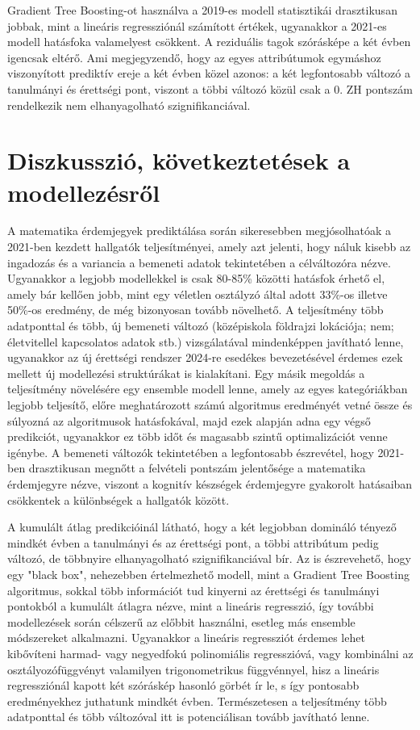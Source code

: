 \documentclass[12pt]{article}
\begin{document}
\noindent Gradient Tree Boosting-ot használva a 2019-es modell statisztikái drasztikusan jobbak, mint a lineáris regressziónál számított értékek, ugyanakkor a 2021-es modell hatásfoka valamelyest csökkent. A reziduális tagok szórásképe a két évben igencsak eltérő. Ami megjegyzendő, hogy az egyes attribútumok egymáshoz viszonyított prediktív ereje a két évben közel azonos: a két legfontosabb változó a tanulmányi és érettségi pont, viszont a többi változó közül csak a 0. ZH pontszám rendelkezik nem elhanyagolható szignifikanciával.

\newpage 

\section{Diszkusszió, következtetések a modellezésről}

A matematika érdemjegyek prediktálása során sikeresebben megjósolhatóak a 2021-ben kezdett hallgatók teljesítményei, amely azt jelenti, hogy náluk kisebb az ingadozás és a variancia a bemeneti adatok tekintetében a célváltozóra nézve. Ugyanakkor a legjobb modellekkel is csak 80-85\% közötti hatásfok érhető el, amely bár kellően jobb, mint egy véletlen osztályzó által adott 33\%-os illetve 50\%-os eredmény, de még bizonyosan tovább növelhető. A teljesítmény több adatponttal és több, új bemeneti változó (középiskola földrajzi lokációja; nem; életvitellel kapcsolatos adatok stb.) vizsgálatával mindenképpen javítható lenne, ugyanakkor az új érettségi rendszer 2024-re esedékes bevezetésével érdemes ezek mellett új modellezési struktúrákat is kialakítani. Egy másik megoldás a teljesítmény növelésére egy ensemble modell lenne, amely az egyes kategóriákban legjobb teljesítő, előre meghatározott számú algoritmus eredményét vetné össze és súlyozná az algoritmusok hatásfokával, majd ezek alapján adna egy végső predikciót, ugyanakkor ez több időt és magasabb szintű optimalizációt venne igénybe. A bemeneti változók tekintetében a legfontosabb észrevétel, hogy 2021-ben drasztikusan megnőtt a felvételi pontszám jelentősége a matematika érdemjegyre nézve, viszont a kognitív készségek érdemjegyre gyakorolt hatásaiban csökkentek a különbségek a hallgatók között.

A kumulált átlag predikcióinál látható, hogy a két legjobban domináló tényező mindkét évben a tanulmányi és az érettségi pont, a többi attribútum pedig változó, de többnyire elhanyagolható szignifikanciával bír. Az is észrevehető, hogy egy "black box", nehezebben értelmezhető modell, mint a Gradient Tree Boosting algoritmus, sokkal több információt tud kinyerni az érettségi és tanulmányi pontokból a kumulált átlagra nézve, mint a lineáris regresszió, így további modellezések során célszerű az előbbit használni, esetleg más ensemble módszereket alkalmazni. Ugyanakkor a lineáris regressziót érdemes lehet kibővíteni harmad- vagy negyedfokú polinomiális regresszióvá, vagy kombinálni az osztályozófüggvényt valamilyen trigonometrikus függvénnyel, hisz a lineáris regressziónál kapott két szóráskép hasonló görbét ír le, s így pontosabb eredményekhez juthatunk mindkét évben. Természetesen a teljesítmény több adatponttal és több változóval itt is potenciálisan tovább javítható lenne. 
\end{document}
